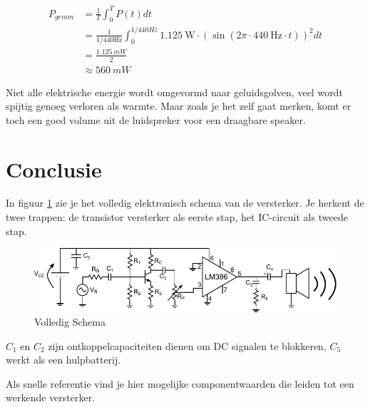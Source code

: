 \documentclass{article}
\begin{document}
			\begin{align}
			P_{gemm} &= \frac{1}{T} \int_0^T P(t) dt \\ 
			& = \frac{1}{1/440 \text{Hz}} \int_0^{1/440Hz} 1.125~\text{W} \cdot \left( \sin \left(2\pi \cdot 440~\text{Hz} \cdot t\right) \right)^2 dt \\&= \frac{1.125~mW}{2} \\ 
			& \approx 560~mW
			\end{align}


			Niet alle elektrische energie  wordt omgevormd naar geluidsgolven, veel wordt spijtig genoeg verloren als warmte. Maar zoals je het zelf gaat merken, komt er toch een goed volume uit de luidspreker voor een draagbare speaker.
	\section{Conclusie}

		In figuur \ref{fig:volledig_schema} zie je het volledig elektronisch schema van de versterker. Je herkent de twee trappen: de transistor versterker als eerste stap, het IC-circuit als tweede stap. 
		\begin{figure}[htbp]
			\includegraphics[width=\linewidth]{volledig_schema}
			\caption{Volledig Schema}
			\label{fig:volledig_schema}
		\end{figure}
		$C_1$ en $C_2$ zijn ontkoppelcapaciteiten dienen om DC signalen te blokkeren, $C_5$ werkt als een hulpbatterij.

		Als snelle referentie vind je hier mogelijke componentwaarden die leiden tot een werkende versterker.

		\begin{center}
			\noindent {}
		\end{center}
\end{document}
